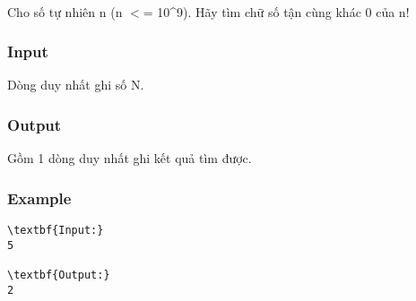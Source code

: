 

 

Cho số tự nhiên n (n $<$= 10\textasciicircum9). Hãy tìm chữ số tận cùng khác 0 của n!

\subsubsection{Input}

Dòng duy nhất ghi số N.

\subsubsection{Output}

Gồm 1 dòng duy nhất ghi kết quả tìm được.

\subsubsection{Example}
\begin{verbatim}
\textbf{Input:}
5

\textbf{Output:}
2
\end{verbatim}